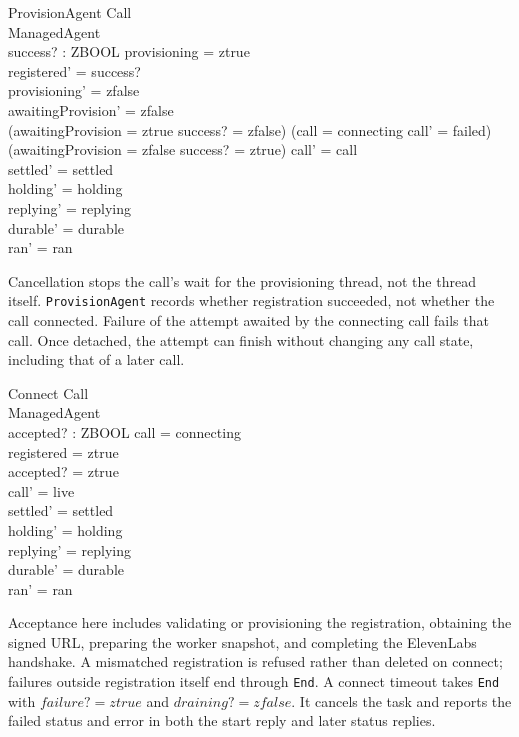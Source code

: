 \documentclass[a4paper,10pt,fleqn]{article}
\begin{document}
\begin{schema}{ProvisionAgent}
  \Delta Call \\
  \Delta ManagedAgent \\
  success? : ZBOOL
\where
  provisioning = ztrue \\
  registered' = success? \\
  provisioning' = zfalse \\
  awaitingProvision' = zfalse \\
  (awaitingProvision = ztrue \land success? = zfalse) \implies
    (call = connecting \land call' = failed) \\
  (awaitingProvision = zfalse \lor success? = ztrue) \implies call' = call \\
  settled' = settled \\
  holding' = holding \\
  replying' = replying \\
  durable' = durable \\
  ran' = ran
\end{schema}

Cancellation stops the call's wait for the provisioning thread, not the
thread itself. \texttt{ProvisionAgent} records whether registration succeeded,
not whether the call connected. Failure of the attempt awaited by the
connecting call fails that call. Once detached, the attempt can finish
without changing any call state, including that of a later call.

\begin{schema}{Connect}
  \Delta Call \\
  \Xi ManagedAgent \\
  accepted? : ZBOOL
\where
  call = connecting \\
  registered = ztrue \\
  accepted? = ztrue \\
  call' = live \\
  settled' = settled \\
  holding' = holding \\
  replying' = replying \\
  durable' = durable \\
  ran' = ran
\end{schema}

Acceptance here includes validating or provisioning the registration,
obtaining the signed URL, preparing the worker snapshot, and completing the
ElevenLabs handshake. A mismatched registration is refused rather than
deleted on connect; failures outside registration itself end through
\texttt{End}. A connect timeout takes \texttt{End} with
$failure? = ztrue$ and $draining? = zfalse$. It cancels the task and
reports the failed status and error in both the start reply and later
status replies.
\end{document}
